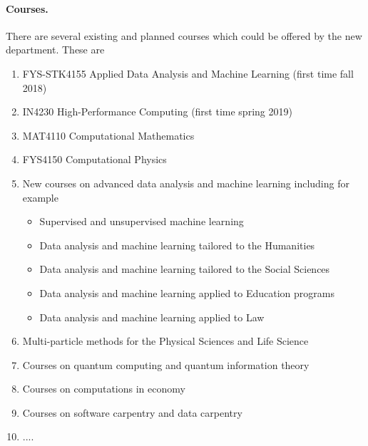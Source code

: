 \documentclass[%
oneside,                 %
final,                   %
10pt]{article}
\begin{document}
\paragraph{Courses.}
There are several existing and planned courses which could be offered by the new department.
These are
\begin{enumerate}
\item FYS-STK4155 Applied Data Analysis and Machine Learning  (first time fall 2018)

\item IN4230 High-Performance Computing  (first time spring 2019)

\item MAT4110 Computational Mathematics

\item FYS4150 Computational Physics

\item New courses on advanced data analysis and machine learning including for example
\begin{itemize}

  \item Supervised and unsupervised machine learning

  \item Data analysis and machine learning tailored to the Humanities

  \item Data analysis and machine learning tailored to the Social Sciences

  \item Data analysis and machine learning applied to Education programs

  \item Data analysis and machine learning applied to Law 

\end{itemize}

\noindent
\item Multi-particle methods for the Physical Sciences and Life Science

\item Courses on quantum computing and quantum information theory

\item Courses on computations in economy

\item Courses on software carpentry and data carpentry

\item ....
\end{enumerate}
\end{document}
